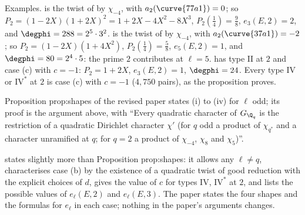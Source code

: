 Examples.  is the twist of  by $\chi_{-4}$, with $a_2(\curve{77a1})=0$; so $P_2=(1-2X)(1+2X)^2=1+2X-4X^2-8X^3$, $P_2(\frac14)=\frac98$, $e_3(E,2)=2$, and
$\degphi=288=2^5\cdot3^2$.  is the twist of  by $\chi_{-4}$, with $a_2(\curve{37a1})=-2$; so $P_2=(1-2X)(1+4X^2)$, $P_2(\frac14)=\frac58$, $e_5(E,2)=1$, and
$\degphi=80=2^4\cdot5$: the prime $2$ contributes at $\ell=5$.  has type $\mathrm{II}$ at $2$ and case (c) with $c=-1$: $P_2=1+2X$, $e_3(E,2)=1$, $\degphi=24$. Every type $\mathrm{IV}$
or $\mathrm{IV}^*$ at $2$ is case (c) with $c=-1$ ($4{,}750$ pairs), as the proposition proves.

\begin{paperlink}
Proposition prop:shapes of the revised paper states (i) to (iv) for $\ell$ odd; its proof is the argument above, with ``Every quadratic character of $G_{\Q_q}$ is the restriction of a
quadratic Dirichlet character $\chi'$ (for $q$ odd a product of $\chi_{q^*}$ and a character unramified at $q$; for $q=2$ a product of $\chi_{-4}$, $\chi_8$ and $\chi_5$)''.
\end{paperlink}

\begin{remark}\label{rem:lfunctions:shapes-commentary}
 states slightly more than Proposition prop:shapes: it allows any $\ell\ne q$, characterises case (b) by the existence of a quadratic twist of good
reduction with the explicit choices of $d$, gives the value of $c$ for types $\mathrm{IV}$, $\mathrm{IV}^*$ at $2$, and lists the possible values of $e_\ell(E,2)$ and $e_\ell(E,3)$. The paper
states the four shapes and the formulas for $e_\ell$ in each case; nothing in the paper's arguments changes.
\end{remark}

